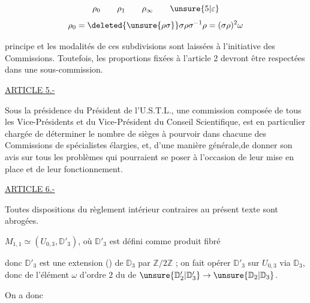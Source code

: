 \[
\rho_0\qquad\rho_1\qquad\rho_\infty\qquad\unsure{5|\varepsilon}
\]
\[
\rho_0=\deleted{\unsure{\rho\sigma}}\sigma\rho\sigma^{-1}\rho
=(\sigma\rho)^2\omega
\]

principe et les modalités de ces subdivisions sont laissées à l'initiative des
Commissions. Toutefois, les proportions fixées à l'article 2 devront être respectées
dans une sous-commission.

\uline{ARTICLE 5.-}

Sous la présidence du Président de l'U.S.T.L., une commission composée
de tous les Vice-Présidents et du Vice-Président du Conseil Scientifique, est
en particulier chargée de déterminer le nombre de sièges à pourvoir dans chacune
des Commissions de spécialistes élargies, et, d'une manière générale,de
donner son avis sur tous les problèmes qui pourraient se poser à l'occasion
de leur mise en place et de leur fonctionnement.

\uline{ARTICLE 6.-}

Toutes dispositions du règlement intérieur contraires au présent texte
sont abrogées.


$M_{1,1}\simeq (U_{0,3},\mathbb D'_3)$, où $\mathbb D'_3$ est défini comme produit fibré



donc $\mathbb D'_3$ est une extension () de $\mathbb D_3$ par $\mathbb Z/2\mathbb Z$ ;  on fait opérer $\mathbb D'_3$ sur $U_{0,3}$ via $\mathbb D_3$, donc  de l'élément $\omega$ d'ordre $2$ du  de $\unsure{\mathbb D'_2|\mathbb D'_3}\to\unsure{\mathbb D_2|\mathbb D_3}$.

On a donc


